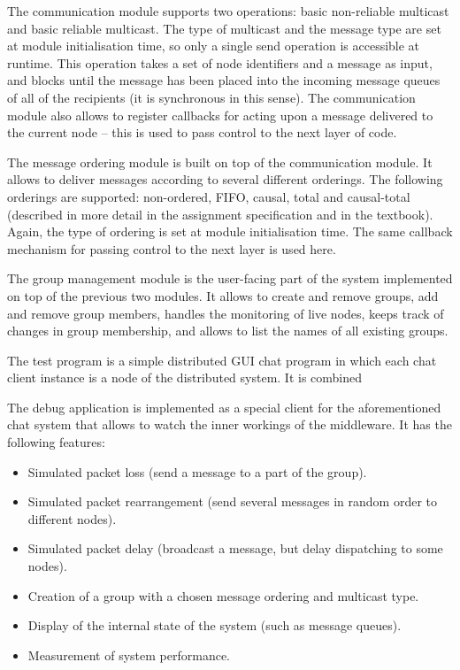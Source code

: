 \documentclass[10pt, oneside]{article}
\begin{document}
The communication module supports two operations: basic non-reliable multicast
and basic reliable multicast. The type of multicast and the message type are set
at module initialisation time, so only a single send operation is accessible at
runtime. This operation takes a set of node identifiers and a message as input,
and blocks until the message has been placed into the incoming message queues of
all of the recipients (it is synchronous in this sense). The communication
module also allows to register callbacks for acting upon a message delivered to
the current node -- this is used to pass control to the next layer of code.

The message ordering module is built on top of the communication module. It
allows to deliver messages according to several different orderings. The
following orderings are supported: non-ordered, FIFO, causal, total and
causal-total (described in more detail in the assignment specification and in
the textbook\cite{Textbook}). Again, the type of ordering is set at module
initialisation time. The same callback mechanism for passing control to the next
layer is used here.

The group management module is the user-facing part of the system implemented on
top of the previous two modules. It allows to create and remove groups, add and
remove group members, handles the monitoring of live nodes, keeps track of
changes in group membership, and allows to list the names of all existing
groups.

The test program is a simple distributed GUI chat program in which each chat
client instance is a node of the distributed system. It is combined

The debug application is implemented as a special client for the aforementioned
chat system that allows to watch the inner workings of the middleware. It has
the following features:
\begin{itemize}
\item Simulated packet loss (send a message to a part of the group).
\item Simulated packet rearrangement (send several messages in random order to
  different nodes).
\item Simulated packet delay (broadcast a message, but delay dispatching to some
  nodes).
\item Creation of a group with a chosen message ordering and multicast type.
\item Display of the internal state of the system (such as message queues).
\item Measurement of system performance.
\end{itemize}
\end{document}

